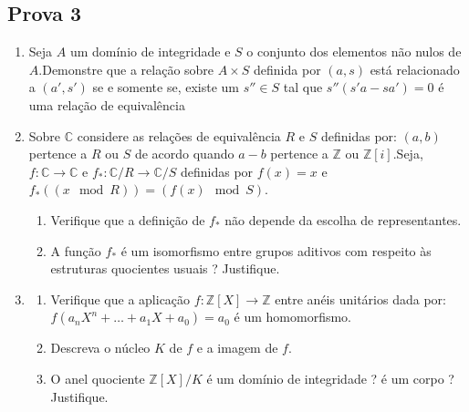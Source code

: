 \subsection{Prova 3}

\begin{enumerate}[left=0.5cm, align=left, nosep]
    \item Seja $A$ um domínio de integridade e $S$ o conjunto dos elementos não nulos de $A$.Demonstre que a relação sobre 
    $A \times S$ definida por $(a,s)$ está relacionado a $(a',s')$ se e somente se, existe um $s'' \in S$ tal que 
    $s''(s'a - sa') = 0$ é uma relação de equivalência

   \item Sobre $\mathbb{C}$ considere as relações de equivalência $R$ e $S$ definidas por: $(a,b)$ pertence a $R$ ou $S$ 
   de acordo quando $a - b$ pertence a $\mathbb{Z}$ ou $\mathbb{Z}[i]$.Seja, $f: \mathbb{C} \rightarrow \mathbb{C}$ e 
   $f_* : \mathbb{C}/R \rightarrow \mathbb{C}/S$ definidas por $f(x) = x$ e $f_*((x \mod R)) = (f(x) \mod S)$. 
    \begin{enumerate}[label=\alph*), left=0.5cm, align=left, nosep] 
        \item Verifique que a definição de $f_*$ não depende da escolha de representantes. 
        \item A função $f_*$ é um isomorfismo entre grupos aditivos com respeito às estruturas quocientes usuais ? Justifique. 
    \end{enumerate}

    \item
    \begin{enumerate}[label=\alph*), left=0.5cm, align=left, nosep] 
        \item Verifique que a aplicação $f: \mathbb{Z}[X] \rightarrow \mathbb{Z}$ entre anéis unitários dada por: 
        $f(a_nX^n + \ldots + a_1X + a_0 ) = a_0$ é um homomorfismo. 
        \item Descreva o núcleo $K$ de $f$ e a imagem de $f$. 
        \item O anel quociente $\mathbb{Z}[X]/K$ é um domínio de integridade ? é um corpo ? Justifique. 
    \end{enumerate}


\end{enumerate}
